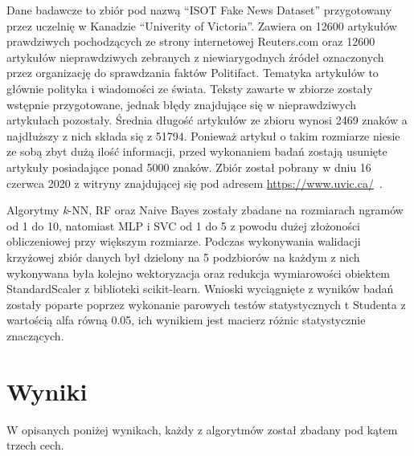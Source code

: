 Dane badawcze to zbiór pod nazwą ``ISOT Fake News Dataset'' przygotowany przez uczelnię w 
Kanadzie ``Univerity of Victoria''. Zawiera on 12600 artykułów prawdziwych pochodzących ze strony
internetowej Reuters.com oraz 12600 artykułów nieprawdziwych zebranych z niewiarygodnych źródeł
oznaczonych przez organizację do sprawdzania faktów Politifact. Tematyka artykułów to głównie polityka i wiadomości 
ze świata. Teksty zawarte w zbiorze zostały wstępnie przygotowane, jednak błędy znajdujące się w nieprawdziwych 
artykułach pozostały. Średnia długość artykułów ze zbioru wynosi 2469 znaków a najdłuższy z nich składa się z 51794.
Ponieważ artykuł o takim rozmiarze niesie ze sobą zbyt dużą ilość informacji, przed wykonaniem badań zostają usunięte 
artykuły posiadające ponad 5000 znaków. Zbiór został pobrany w dniu 16 czerwca 2020 z witryny znajdującej się 
pod adresem \url{https://www.uvic.ca/}~\cite{ISOT}.

Algorytmy \textit{k}-NN, RF oraz Naive Bayes zostały zbadane na rozmiarach ngramów od 1 do 10, natomiast
MLP i SVC od 1 do 5 z powodu dużej złożoności obliczeniowej przy większym rozmiarze. Podczas 
wykonywania walidacji krzyżowej zbiór danych był dzielony na 5 podzbiorów na każdym z nich wykonywana była kolejno 
wektoryzacja oraz redukcja wymiarowości obiektem StandardScaler z biblioteki scikit-learn.
Wnioski wyciągnięte z wyników badań zostały poparte poprzez wykonanie parowych testów statystycznych 
t Studenta z wartością alfa równą 0.05, ich
wynikiem jest macierz różnic statystycznie znaczących.
\section{Wyniki}
W opisanych poniżej wynikach, każdy z algorytmów został zbadany pod kątem trzech cech. 
\begin{table}[H]
    \centering
    \caption{Wyniki algorytmu \textit{k}-NN wektoryzacja metodą Bag of words}
\end{table}

